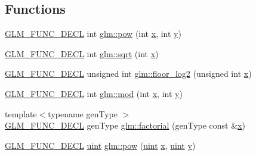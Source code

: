 \subsection*{Functions}
\begin{DoxyCompactItemize}
\item 
\mbox{\hyperlink{setup_8hpp_ab2d052de21a70539923e9bcbf6e83a51}{G\+L\+M\+\_\+\+F\+U\+N\+C\+\_\+\+D\+E\+CL}} int \mbox{\hyperlink{group__gtx__integer_ga9642514a44a67afa70966d756f040ca9}{glm\+::pow}} (int \mbox{\hyperlink{glad_8h_a92d0386e5c19fb81ea88c9f99644ab1d}{x}}, int \mbox{\hyperlink{glad_8h_a66ddd433d2cacfe27f5906b7e86faeed}{y}})
\item 
\mbox{\hyperlink{setup_8hpp_ab2d052de21a70539923e9bcbf6e83a51}{G\+L\+M\+\_\+\+F\+U\+N\+C\+\_\+\+D\+E\+CL}} int \mbox{\hyperlink{group__gtx__integer_ga78e2e68330e91d350fcfc2f4831cad12}{glm\+::sqrt}} (int \mbox{\hyperlink{glad_8h_a92d0386e5c19fb81ea88c9f99644ab1d}{x}})
\item 
\mbox{\hyperlink{setup_8hpp_ab2d052de21a70539923e9bcbf6e83a51}{G\+L\+M\+\_\+\+F\+U\+N\+C\+\_\+\+D\+E\+CL}} unsigned int \mbox{\hyperlink{group__gtx__integer_ga7011b4e1c1e1ed492149b028feacc00e}{glm\+::floor\+\_\+log2}} (unsigned int \mbox{\hyperlink{glad_8h_a92d0386e5c19fb81ea88c9f99644ab1d}{x}})
\item 
\mbox{\hyperlink{setup_8hpp_ab2d052de21a70539923e9bcbf6e83a51}{G\+L\+M\+\_\+\+F\+U\+N\+C\+\_\+\+D\+E\+CL}} int \mbox{\hyperlink{group__gtx__integer_gab9d22df91aac4d9eb925a4910f556f1b}{glm\+::mod}} (int \mbox{\hyperlink{glad_8h_a92d0386e5c19fb81ea88c9f99644ab1d}{x}}, int \mbox{\hyperlink{glad_8h_a66ddd433d2cacfe27f5906b7e86faeed}{y}})
\item 
{\footnotesize template$<$typename gen\+Type $>$ }\\\mbox{\hyperlink{setup_8hpp_ab2d052de21a70539923e9bcbf6e83a51}{G\+L\+M\+\_\+\+F\+U\+N\+C\+\_\+\+D\+E\+CL}} gen\+Type \mbox{\hyperlink{group__gtx__integer_ga8cbd3120905f398ec321b5d1836e08fb}{glm\+::factorial}} (gen\+Type const \&\mbox{\hyperlink{glad_8h_a92d0386e5c19fb81ea88c9f99644ab1d}{x}})
\item 
\mbox{\hyperlink{setup_8hpp_ab2d052de21a70539923e9bcbf6e83a51}{G\+L\+M\+\_\+\+F\+U\+N\+C\+\_\+\+D\+E\+CL}} \mbox{\hyperlink{group__core__precision_ga4fd29415871152bfb5abd588334147c8}{uint}} \mbox{\hyperlink{group__gtx__integer_gaa8229e850c3cc4ad83492fe390ada044}{glm\+::pow}} (\mbox{\hyperlink{group__core__precision_ga4fd29415871152bfb5abd588334147c8}{uint}} \mbox{\hyperlink{glad_8h_a92d0386e5c19fb81ea88c9f99644ab1d}{x}}, \mbox{\hyperlink{group__core__precision_ga4fd29415871152bfb5abd588334147c8}{uint}} \mbox{\hyperlink{glad_8h_a66ddd433d2cacfe27f5906b7e86faeed}{y}})

\end{DoxyCompactItemize}
